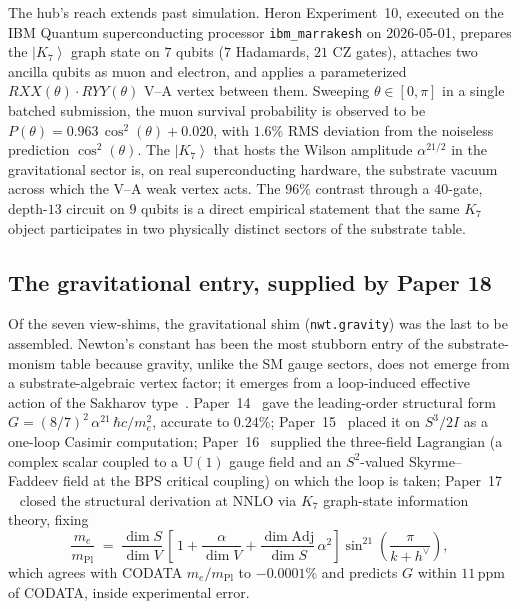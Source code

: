 \documentclass[11pt]{article}
\newcommand{\Adj}{\mathrm{Adj}}
\newcommand{\ket}[1]{\left|#1\right\rangle}
\newcommand{\mPl}{m_{\mathrm{Pl}}}
\newcommand{\me}{m_e}
\newcommand{\hv}{h^{\vee}}
\newcommand{\U}{\mathrm{U}}
\begin{document}
The hub's reach extends past simulation.  Heron Experiment~10,
executed on the IBM Quantum superconducting processor
\texttt{ibm\_marrakesh} on 2026-05-01, prepares the $\ket{K_7}$
graph state on $7$ qubits ($7$ Hadamards, $21$ CZ gates), attaches
two ancilla qubits as muon and electron, and applies a parameterized
$RXX(\theta) \cdot RYY(\theta)$ V--A vertex between them.  Sweeping
$\theta \in [0,\pi]$ in a single batched submission, the muon
survival probability is observed to be
$P(\theta) = 0.963\,\cos^2(\theta) + 0.020$, with $1.6\%$ RMS
deviation from the noiseless prediction $\cos^2(\theta)$.  The
$\ket{K_7}$ that hosts the Wilson amplitude $\alpha^{21/2}$ in the
gravitational sector is, on real superconducting hardware, the
substrate vacuum across which the V--A weak vertex acts.  The
$96\%$ contrast through a $40$-gate, depth-$13$ circuit on $9$
qubits is a direct empirical statement that the same $K_7$ object
participates in two physically distinct sectors of the substrate
table.

\subsection{The gravitational entry, supplied by Paper 18}

Of the seven view-shims, the gravitational shim
(\texttt{nwt.gravity}) was the last to be assembled.  Newton's
constant has been the most stubborn entry of the substrate-monism
table because gravity, unlike the SM gauge sectors, does not
emerge from a substrate-algebraic vertex factor; it emerges from a
loop-induced effective action of the Sakharov
type~\cite{sakharov1968, visser2002}.  Paper~14~\cite{paper14}
gave the leading-order structural form
$G = (8/7)^2\,\alpha^{21}\,\hbar c / \me^2$, accurate to $0.24\%$;
Paper~15~\cite{paper15} placed it on $S^3/2I$ as a one-loop
Casimir computation; Paper~16~\cite{paper16} supplied the
three-field Lagrangian (a complex scalar coupled to a $\U(1)$
gauge field and an $S^2$-valued Skyrme--Faddeev field at the BPS
critical coupling) on which the loop is taken; Paper~17%
~\cite{paper17} closed the structural derivation at NNLO via
$K_7$ graph-state information theory, fixing
\begin{equation}
  \frac{\me}{\mPl}
    \;=\;
    \frac{\dim S}{\dim V}\,
    \left[\, 1
      + \frac{\alpha}{\dim V}
      + \frac{\dim \Adj}{\dim S}\,\alpha^2
    \right]
    \sin^{21}\!\left(\frac{\pi}{k + \hv}\right),
  \label{eq:p17-recap}
\end{equation}
which agrees with CODATA $\me/\mPl$ to $-0.0001\%$ and predicts
$G$ within $11$\,ppm of CODATA, inside experimental error.
\end{document}
